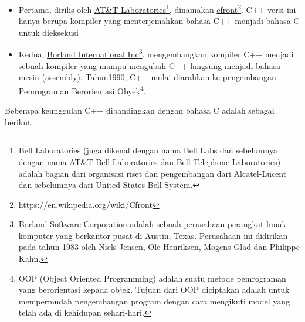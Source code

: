 \begin{itemize}
\tightlist
\item
  Pertama, dirilis oleh
  \href{https://id.wikipedia.org/wiki/Bell_Laboratories}{AT\&T
  Laboratories}\footnote{Bell Laboratories (juga dikenal dengan nama Bell Labs dan sebelumnya dengan nama AT\&T Bell Laboratories dan Bell Telephone Laboratories) adalah bagian dari organisasi riset dan pengembangan dari Alcatel-Lucent dan sebelumnya dari United States Bell System.}, dinamakan
  \href{https://en.wikipedia.org/wiki/Cfront}{cfront}\footnote{https://en.wikipedia.org/wiki/Cfront}. C++ versi ini
  hanya berupa kompiler yang menterjemahkan bahasa C++ menjadi bahasa C
  untuk dieksekusi
\item
  Kedua, \href{https://en.wikipedia.org/wiki/Borland}{Borland
  International Inc}\footnote{Borland Software Corporation adalah sebuah perusahaan perangkat lunak komputer yang berkantor pusat di Austin, Texas. Perusahaan ini didirikan pada tahun 1983 oleh Niels Jensen, Ole Henriksen, Mogens Glad dan Philippe Kahn.}. mengembangkan kompiler C++ menjadi sebuah kompiler
  yang mampu mengubah C++ langsung menjadi bahasa mesin (assembly).
  Tahun1990, C++ mulai diarahkan ke pengembangan
  \href{https://id.wikipedia.org/wiki/Pemrograman_berorientasi_objek}{Pemrograman
  Berorientasi Obyek}\footnote{OOP (Object Oriented Programming) adalah suatu metode pemrograman yang berorientasi kepada objek. Tujuan dari OOP diciptakan adalah untuk mempermudah pengembangan program dengan cara mengikuti model yang telah ada di kehidupan sehari-hari.}.
\end{itemize}

Beberapa keunggulan C++ dibandingkan dengan bahasa C adalah sebagai
berikut.

